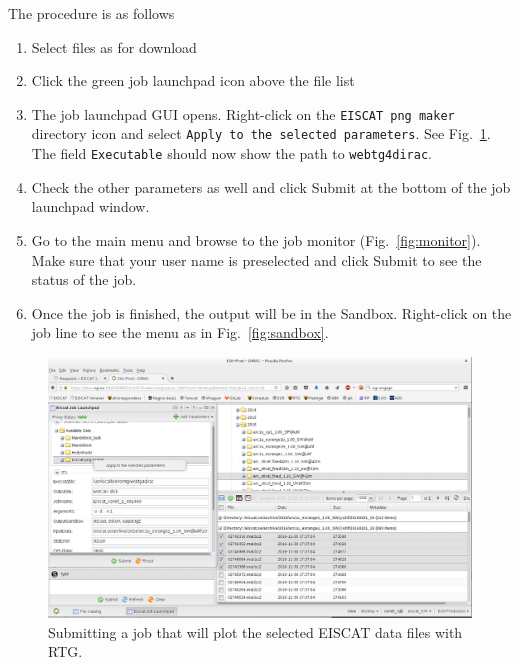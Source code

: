 \documentclass[a4paper]{article}
\begin{document}
The procedure is as follows
\begin{enumerate}
\item Select files as for download
\item Click the green job launchpad icon above the file list
\item The job launchpad GUI opens. Right-click on the \texttt{EISCAT png maker} directory icon and select \texttt{Apply to the selected parameters}. See Fig.~\ref{fig:submit}.
The field \texttt{Executable} should now show the path to \texttt{webtg4dirac}.
\item Check the other parameters as well and click Submit at the bottom of the job launchpad window.
\item Go to the main menu and browse to the job monitor (Fig.~\ref{fig:monitor}). Make sure that your user name is preselected and click Submit to see the status of the job.
\item Once the job is finished, the output will be in the Sandbox. Right-click on the job line to see the menu as in Fig.~\ref{fig:sandbox}.
\end{enumerate}


\begin{figure}[htb]
  \centering
  \includegraphics[width=1.0\linewidth]{dirac-gui-jobsubm}
  \caption{Submitting a job that will plot the selected EISCAT data files with RTG.}
  \label{fig:submit}
\end{figure}
\end{document}
